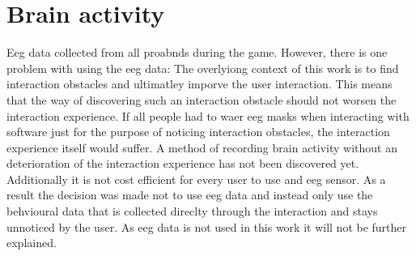 


\section{Brain activity}
\label{brain_activity}
Eeg data collected from all proabnds during the game. However, there is one problem with using the eeg data: The overlyiong context of this work is to find interaction obstacles and ultimatley imporve the user interaction. This means that the way of discovering such an interaction obstacle should not worsen the interaction experience. If all people had to waer eeg masks when interacting with software just for the purpose of noticing interaction obstacles, the interaction experience itself would suffer. A method of recording brain activity without an deterioration of the interaction experience has not been discovered yet. Additionally it is not cost efficient for every user to use and eeg sensor. As a result the decision was made not to use eeg data and instead only use the behvioural data that is collected direclty through the interaction and stays unnoticed by the user. As eeg data is not used in this work it will not be further explained. 




